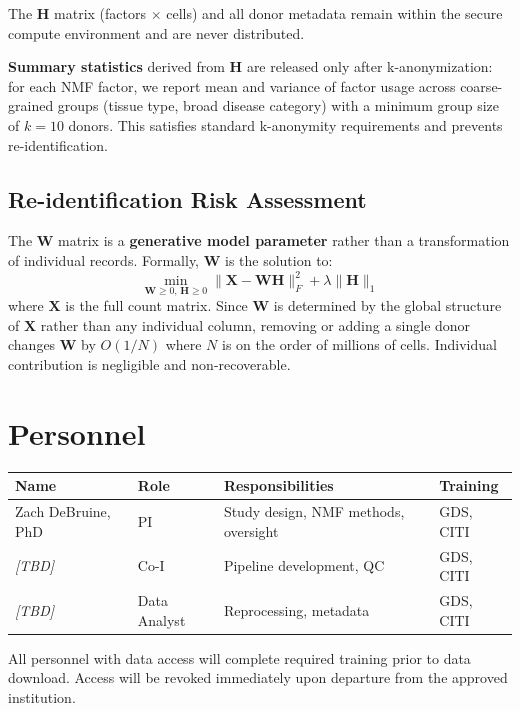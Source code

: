 \documentclass[11pt,letterpaper]{article}
\begin{document}
The $\mathbf{H}$ matrix (factors $\times$ cells) and all donor metadata
remain within the secure compute environment and are never distributed.

\textbf{Summary statistics} derived from $\mathbf{H}$ are released only
after k-anonymization: for each NMF factor, we report mean and variance
of factor usage across coarse-grained groups (tissue type, broad disease
category) with a minimum group size of $k = 10$ donors. This satisfies
standard k-anonymity requirements and prevents re-identification.

\subsection{Re-identification Risk Assessment}

The $\mathbf{W}$ matrix is a \textbf{generative model parameter} rather
than a transformation of individual records. Formally, $\mathbf{W}$ is
the solution to:
\[
    \min_{\mathbf{W} \geq 0,\, \mathbf{H} \geq 0}
    \| \mathbf{X} - \mathbf{W}\mathbf{H} \|_F^2
    + \lambda \|\mathbf{H}\|_1
\]
where $\mathbf{X}$ is the full count matrix. Since $\mathbf{W}$ is
determined by the global structure of $\mathbf{X}$ rather than any
individual column, removing or adding a single donor changes
$\mathbf{W}$ by $O(1/N)$ where $N$ is on the order of millions of
cells. Individual contribution is negligible and non-recoverable.

\section{Personnel}

\begin{longtable}{@{} l l p{5.5cm} l @{}}
\toprule
\textbf{Name} & \textbf{Role} & \textbf{Responsibilities} & \textbf{Training} \\
\midrule
\endhead
Zach DeBruine, PhD & PI & Study design, NMF methods, oversight & GDS, CITI \\
\textit{[TBD]} & Co-I & Pipeline development, QC & GDS, CITI \\
\textit{[TBD]} & Data Analyst & Reprocessing, metadata & GDS, CITI \\
\bottomrule
\end{longtable}

All personnel with data access will complete required training prior to
data download. Access will be revoked immediately upon departure from the
approved institution.
\end{document}
